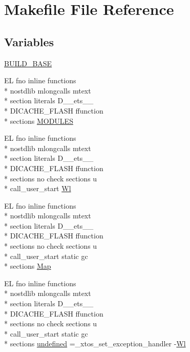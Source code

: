 \hypertarget{Makefile}{\section{Makefile File Reference}
\label{Makefile}
}
\subsection*{Variables}
\begin{DoxyCompactItemize}
\item 
\hyperlink{Makefile_aaa9bbf75d7f8fc94a5c7dd9504b7a178}{B\-U\-I\-L\-D\-\_\-\-B\-A\-S\-E}
\item 
E\-L fno inline functions \\*
nostdlib mlongcalls mtext \\*
section literals D\-\_\-\-\_\-ets\-\_\-\-\_\- \\*
D\-I\-C\-A\-C\-H\-E\-\_\-\-F\-L\-A\-S\-H ffunction \\*
sections \hyperlink{Makefile_af8b8a61c029c5ab0a5518b7f5421c6ac}{M\-O\-D\-U\-L\-E\-S}
\item 
E\-L fno inline functions \\*
nostdlib mlongcalls mtext \\*
section literals D\-\_\-\-\_\-ets\-\_\-\-\_\- \\*
D\-I\-C\-A\-C\-H\-E\-\_\-\-F\-L\-A\-S\-H ffunction \\*
sections no check sections u \\*
call\-\_\-user\-\_\-start \hyperlink{Makefile_afb1782b240d70229ae5bc6b111f9794a}{Wl}
\item 
E\-L fno inline functions \\*
nostdlib mlongcalls mtext \\*
section literals D\-\_\-\-\_\-ets\-\_\-\-\_\- \\*
D\-I\-C\-A\-C\-H\-E\-\_\-\-F\-L\-A\-S\-H ffunction \\*
sections no check sections u \\*
call\-\_\-user\-\_\-start static gc \\*
sections \hyperlink{Makefile_a3f923b64cf6726ab0bfdd17b9aff0a96}{Map}
\item 
E\-L fno inline functions \\*
nostdlib mlongcalls mtext \\*
section literals D\-\_\-\-\_\-ets\-\_\-\-\_\- \\*
D\-I\-C\-A\-C\-H\-E\-\_\-\-F\-L\-A\-S\-H ffunction \\*
sections no check sections u \\*
call\-\_\-user\-\_\-start static gc \\*
sections \hyperlink{Makefile_a9324bb2c20136255586f3b51593c4291}{undefined} =\-\_\-xtos\-\_\-set\-\_\-exception\-\_\-handler -\/\hyperlink{Makefile_afb1782b240d70229ae5bc6b111f9794a}{Wl}
\end{DoxyCompactItemize}


